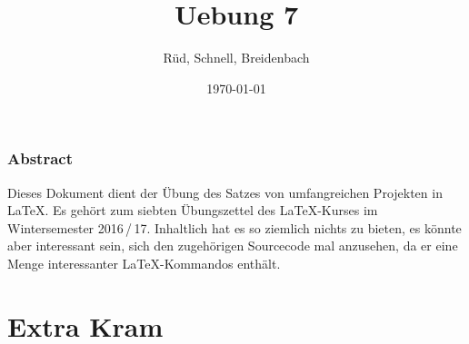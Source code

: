 \documentclass{scrreprt}
\begin{document}
\author{Rüd, Schnell, Breidenbach}
\title{Uebung 7}
\date{\today}
\maketitle
\tableofcontents
\newpage
\subsection*{Abstract}
Dieses Dokument dient der Übung des Satzes von umfangreichen Projekten in \LaTeX{}. Es gehört zum siebten Übungszettel des \LaTeX-Kurses im Wintersemester 2016\,/\,17. Inhaltlich hat es so ziemlich nichts zu bieten, es könnte aber interessant sein, sich den zugehörigen Sourcecode mal anzusehen, da er eine Menge interessanter \LaTeX-Kommandos enthält.






\chapter{Extra Kram}


\printindex
\renewcommand{\listfigurename}{Liste der Abbildungen}
\renewcommand{\listtablename}{Liste der Tabellen}
\listoffigures
\listoftables
\end{document}
